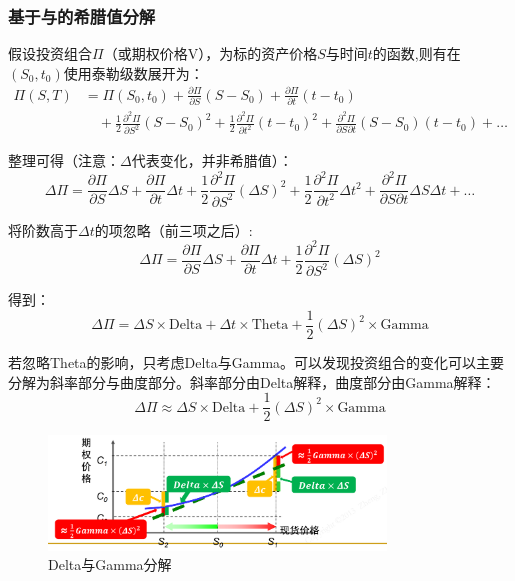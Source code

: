 \documentclass[11pt]{article}
\begin{document}
\subsubsection{基于与的希腊值分解}

假设投资组合$\Pi$（或期权价格V），为标的资产价格$S$与时间$t$的函数,则有在$(S_0,t_0)$使用泰勒级数展开为：
\begin{align*}
    \Pi(S,T) &= \Pi(S_0,t_0) + \frac{\partial \Pi}{\partial S}(S-S_0) + \frac{\partial \Pi}{\partial t}(t-t_0) \\
    &\quad + \frac{1}{2}\frac{\partial^2 \Pi}{\partial S^2}(S-S_0)^2 + \frac{1}{2}\frac{\partial^2 \Pi}{\partial t^2}(t-t_0)^2 + \frac{\partial^2 \Pi}{\partial S \partial t}(S-S_0)(t-t_0) + \dots
\end{align*}

整理可得（注意：$\Delta$代表变化，并非希腊值）：
\begin{equation*}
    \Delta \Pi = \frac{\partial \Pi}{\partial S}\Delta S + \frac{\partial \Pi}{\partial t}\Delta t + \frac{1}{2}\frac{\partial^2 \Pi}{\partial S^2}(\Delta S)^2 + \frac{1}{2}\frac{\partial^2 \Pi}{\partial t^2}\Delta t^2 + \frac{\partial^2 \Pi}{\partial S \partial t}\Delta S \Delta t + \dots
\end{equation*}

将阶数高于$\Delta t$的项忽略（前三项之后）:
\begin{equation*}
    \Delta \Pi = \frac{\partial \Pi}{\partial S}\Delta S + \frac{\partial \Pi}{\partial t}\Delta t + \frac{1}{2}\frac{\partial^2 \Pi}{\partial S^2}(\Delta S)^2
\end{equation*}

得到：
\begin{equation*}
    \boxed{
        \Delta \Pi = \Delta S \times \text{Delta} + \Delta t \times \text{Theta} + \frac{1}{2} (\Delta S)^2 \times \text{Gamma}
    }
\end{equation*}

若忽略Theta的影响，只考虑Delta与Gamma。可以发现投资组合的变化可以主要分解为斜率部分与曲度部分。斜率部分由Delta解释，曲度部分由Gamma解释：
\begin{equation*}
    \Delta \Pi \approx \Delta S \times \text{Delta} + \frac{1}{2} (\Delta S)^2 \times \text{Gamma}
\end{equation*}

\begin{figure}[H]
    \centering
    \includegraphics[width=0.8\textwidth]{fig/delta_gamma_decom.png}
    \caption{Delta与Gamma分解}
    \label{fig:delta_gamma_decom}
\end{figure}
\end{document}
